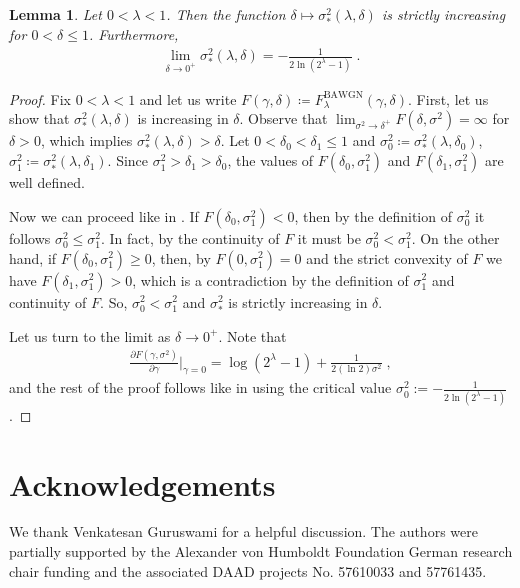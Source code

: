 \documentclass{article}
\DeclareMathOperator{\BAWGN}{BAWGN}
\theoremstyle{plain}
\theoremstyle{plain}
\theoremstyle{plain}
\theoremstyle{plain}
\theoremstyle{plain}
\theoremstyle{plain}
\theoremstyle{plain}
\newtheorem{lemma}[definition]{Lemma}%
\theoremstyle{plain}
\theoremstyle{plain}
\theoremstyle{plain}
\theoremstyle{remark}
\theoremstyle{remark}
\theoremstyle{remark}
\theoremstyle{plain}
\begin{document}
\begin{lemma}
      Let $0<\lambda<1$. Then the function $\delta\mapsto\sigma^2_*(\lambda,\delta)$ is 
      strictly increasing for $0<\delta\le 1$. Furthermore,
    \begin{align*}
        \underset{\delta\to 0^+}{\lim}\sigma^2_*(\lambda,\delta)=-\frac{1}{2\ln(2^\lambda-1)}\;.
    \end{align*}
\end{lemma}
\begin{proof}
Fix $0<\lambda<1$
and let us write $F(\gamma,\delta)\coloneqq 
F_\lambda^{\BAWGN}(\gamma,\delta)$.
First, let us show that $\sigma^2_*(\lambda,\delta)$
is increasing in $\delta$. 
Observe that
$\lim_{\sigma^2\to \delta^+}
F(\delta,\sigma^2)=\infty$
for $\delta>0$, which implies
$\sigma_*^2(\lambda,\delta)>\delta$.
Let $0<\delta_0<\delta_1\le 1$ and
$\sigma_0^2\coloneqq \sigma_*^2(\lambda,\delta_0)$,
$\sigma_1^2\coloneqq \sigma_*^2(\lambda,\delta_1)$.
Since $\sigma_1^2>\delta_1>\delta_0$, the values
of $F(\delta_0,\sigma_1^2)$
and $F(\delta_1,\sigma_1^2)$ are well defined.

Now we can proceed like in . 
If $F(\delta_0,\sigma_1^2)<0$, then by the definition
of $\sigma_0^2$ it follows $\sigma_0^2\le\sigma_1^2$.
In fact, by the continuity of $F$ it must be $\sigma_0^2<\sigma_1^2$. On the other hand,
if $F(\delta_0,\sigma_1^2)\ge 0$, then,
by $F(0,\sigma_1^2)=0$ and the strict convexity of $F$
we have $F(\delta_1,\sigma_1^2)>0$, which is a contradiction
by the definition of $\sigma_1^2$ and continuity of $F$.
So, $\sigma_0^2<\sigma_1^2$ and $\sigma_*^2$ is strictly
increasing in $\delta$.

Let us turn to the limit as $\delta\to 0^+$. Note that
 \begin{align*}
     \frac{\partial F(\gamma,\sigma^2)}{\partial\gamma}\bigg\rvert_{\gamma=0}=\log(2^{\lambda}-1)+\frac{1}{2(\ln 2)\sigma^2}\;,
 \end{align*}
and the rest of the proof follows like in  
using the critical value $\sigma^2_0:=-\frac{1}{2\ln(2^{\lambda}-1)}$.
\end{proof}


\section*{Acknowledgements}
We thank Venkatesan Guruswami for a helpful discussion.
The authors were partially
supported by the Alexander von Humboldt Foundation German research chair
funding and the associated DAAD projects No. 57610033
and 57761435.
\end{document}
